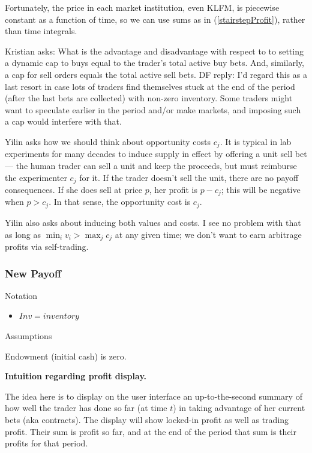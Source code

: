 \documentclass{article}
\begin{document}
Fortunately, the price in each market institution, even KLFM, is piecewise constant as a function of time, so we can use sums as in (\ref{stairstepProfit}), rather than time integrals.

Kristian asks:
What is the advantage and disadvantage with respect to to setting a dynamic cap to buys equal to the trader's total active buy bets. And, similarly, a cap for sell orders equals the total active sell bets.
DF reply: I'd regard this as a last resort
in case lots of traders find themselves stuck at the end of the period (after the last bets are collected) with non-zero inventory.
Some traders might want to speculate 
earlier in the period and/or make markets, and imposing such a cap would interfere with that.

Yilin asks how we should think about opportunity costs $c_j$.
It is typical in lab experiments for many decades to induce supply in effect by offering a unit sell bet --- the human trader can sell a unit and keep the proceeds, but must reimburse the experimenter $c_j$ for it. If the trader doesn't sell the unit, there are no payoff consequences.
If she does sell at price $p$, her profit is
$p-c_j$; this will be negative when 
$p>c_j$. In that sense, the opportunity cost is $c_j$.

Yilin also asks about inducing both values and costs. I see no problem with that as long as $\min_i v_i > \max_j c_j$ at any given time; we don't want to earn arbitrage profits
via self-trading.

\subsubsection*{New Payoff}

Notation 
\begin{itemize}
    \item $Inv = inventory$
\end{itemize}



Assumptions

Endowment (initial cash) is zero.



\vspace{.2in}

\textbf{Intuition regarding profit display.} %

The idea here is to display on the user interface an up-to-the-second summary of how well the trader has done so far (at time $t$) 
in taking advantage of her current bets (aka contracts).
The display will show locked-in profit as well as trading profit. Their sum is profit so far, and at the end of the period that sum is their profits for that period.
\end{document}
